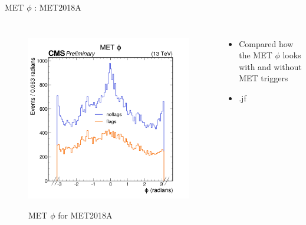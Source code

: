\documentclass[10pt,xcolor=dvipsnames]{beamer}
\begin{document}
  \begin{frame}[fragile]{MET $\phi$ : MET2018A} 
    \begin{columns}
    \begin{figure} 
    \centering 
     \includegraphics[width=1\textwidth]{../Archive/KinemPlots/DataphiMETflags.png }
    \label{METDataflagphi} 
    \caption{MET $\phi$ for MET2018A}
    \end{figure} 
    \begin{itemize} 
    \raggedright 
    \small
    \item Compared how the MET $\phi$ looks with and without MET triggers
    \item .jf
    \end{itemize}
    \end{columns} 
    \end{frame}
\end{document}
